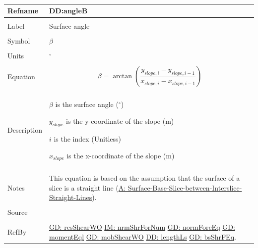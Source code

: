\documentclass[12pt]{article}
\begin{document}
\par~

\noindent \begin{minipage}{\textwidth}
\begin{tabular}{p{} p{}}
\toprule \textbf{Refname} & \textbf{DD:angleB}
\label{DD:angleB}
\\ \midrule \\
Label & Surface angle
        \\ \midrule \\
        Symbol & $β$
                 \\ \midrule \\
                 Units & ${}^{\circ}$
                         \\ \midrule \\
                         Equation & \begin{displaymath}
                                    β=\arctan\left(\frac{{y_{slope,i}}-{y_{slope,i-1}}}{{x_{slope,i}}-{x_{slope,i-1}}}\right)
                                    \end{displaymath}
                                    \\ \midrule \\
                                    Description & \begin{symbDescription}
                                                  \item{$β$ is the surface angle (${}^{\circ}$)}
                                                  \item{${y_{slope}}$ is the y-coordinate of the slope (m)}
                                                  \item{$i$ is the index (Unitless)}
                                                  \item{${x_{slope}}$ is the x-coordinate of the slope (m)}
                                                  \end{symbDescription}
                                                  \\ \midrule \\
                                                  Notes & This equation is based on the assumption that the surface of a slice is a straight line (\hyperref[assumpSBSBISL]{A: Surface-Base-Slice-between-Interslice-Straight-Lines}).
                                                          \\ \midrule \\
                                                          Source & \cite{fredlund1977}
                                                                   \\ \midrule \\
                                                                   RefBy & \hyperref[GD:resShearWO]{GD: resShearWO} \hyperref[IM:nrmShrForNum]{IM: nrmShrForNum} \hyperref[GD:normForcEq]{GD: normForcEq} \hyperref[GD:momentEql]{GD: momentEql} \hyperref[GD:mobShearWO]{GD: mobShearWO} \hyperref[DD:lengthLs]{DD: lengthLs} \hyperref[GD:bsShrFEq]{GD: bsShrFEq}.
\\ \bottomrule \end{tabular}
\end{minipage}
\end{document}
